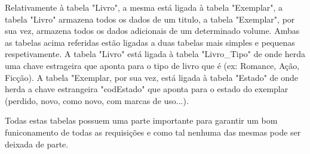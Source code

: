 \par Relativamente à tabela "Livro", a mesma está ligada à tabela "Exemplar", a tabela "Livro" armazena todos os dados de um titulo, a tabela "Exemplar", por sua vez, armazena todos os dados adicionais de um determinado volume.
Ambas as tabelas acima referidas estão ligadas a duas tabelas mais simples e pequenas respetivamente. A tabela "Livro" está ligada à tabela "Livro\_Tipo" de onde herda uma chave estrageira que aponta para o tipo de livro que é (ex: Romance, Ação, Ficção). A tabela "Exemplar, por sua vez, está ligada à tabela "Estado" de onde herda a chave estrangeira "codEstado" que aponta para o estado do exemplar (perdido, novo, como novo, com marcas de uso...).

\par Todas estas tabelas possuem uma parte importante para garantir um bom funiconamento de todas as requisições e como tal nenhuma das mesmas pode ser deixada de parte.
